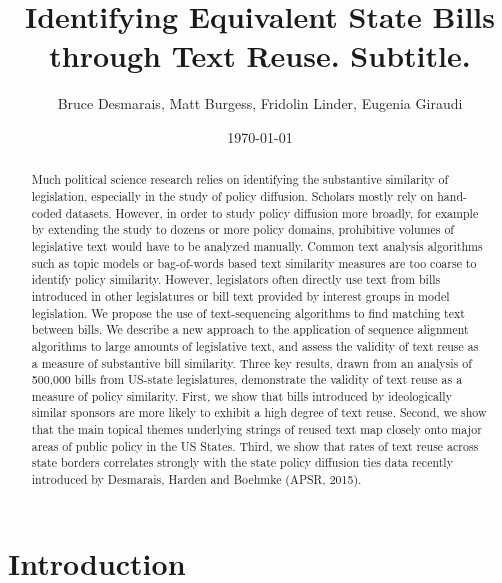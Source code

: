 \documentclass[12pt]{article} %
\providecommand{\DIFaddtex}[1]{{\protect\color{blue}\uwave{#1}}} %
\providecommand{\DIFaddbegin}{} %
\providecommand{\DIFaddend}{} %
\providecommand{\DIFadd}[1]{\texorpdfstring{\DIFaddtex{#1}}{#1}} %
\begin{document}
 

\title{\DIFaddbegin \DIFadd{Text as Policy: }\DIFaddend Identifying Equivalent State Bills through Text Reuse. \large Subtitle.}
\date{\today}
\author{Bruce Desmarais, Matt Burgess, Fridolin Linder, Eugenia Giraudi}

\maketitle

\begin{abstract} 
 Much political science research relies on identifying the substantive similarity of legislation, especially in the study of policy diffusion. Scholars mostly rely on hand-coded datasets. However, in order to study policy diffusion more broadly, for example by extending the study to dozens or more policy domains, prohibitive volumes of legislative text would have to be analyzed manually. Common text analysis algorithms such as topic models or bag-of-words based text similarity measures are too coarse to identify policy similarity. However, legislators often directly use text from bills introduced in other legislatures or bill text provided by interest groups in model legislation. We propose the use of text-sequencing algorithms to find matching text between bills. We describe a new approach to the application of sequence alignment algorithms to large amounts of legislative text, and assess the validity of text reuse as a measure of substantive bill similarity. Three key results, drawn from an analysis of 500,000 bills from US-state legislatures, demonstrate the validity of text reuse as a measure of policy similarity. First, we show that bills introduced by ideologically similar sponsors are more likely to exhibit a high degree of text reuse. Second, we show that the main topical themes underlying strings of reused text map closely onto major areas of public policy in the US States. Third, we show that rates of text reuse across state borders correlates strongly with the state policy diffusion ties data recently introduced by Desmarais, Harden and Boehmke (APSR, 2015).    
\end{abstract}

\section{Introduction}
\end{document}
